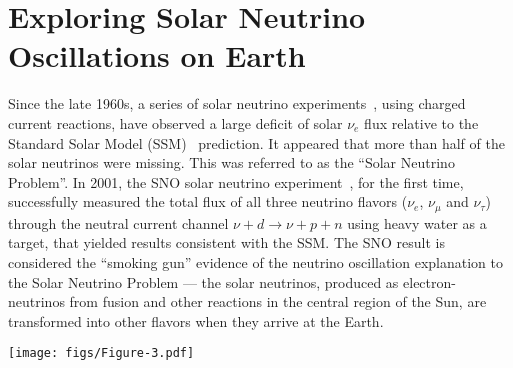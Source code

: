 \documentclass[aps,twocolumn,preprintnumbers,amsmath,superscriptaddress,amssymb,floats,nofootinbib]{revtex4-1}
\begin{document}
\newpage


\twocolumngrid


\section{Exploring Solar Neutrino Oscillations on Earth}
\label{sec:kamland}

Since the late 1960s, a series of solar neutrino experiments~\cite{Homestake,GALLEX,SAGE,Kamiokande,Super-Kamiokande}, using charged current reactions, have observed a large deficit of solar $\nu_e$ flux relative to the Standard Solar Model (SSM)~\cite{Bahcall} prediction.
It appeared that more than half of the solar neutrinos were missing.
This was referred to as the ``Solar Neutrino Problem''.
In 2001, the SNO solar neutrino experiment~\cite{SNO}, for the first time, successfully measured the total flux of all three neutrino flavors ($\nu_e$, $\nu_\mu$ and $\nu_\tau$) through the neutral current channel $\nu + d \to \nu + p + n$ using heavy water as a target, that yielded results consistent with the SSM.
The SNO result is considered the ``smoking gun'' evidence of the neutrino oscillation explanation to the Solar Neutrino Problem --- the solar neutrinos, produced as electron-neutrinos from fusion and other reactions in the central region of the Sun, are transformed into other flavors when they arrive at the Earth.

\begin{figure*}[htb]
  \centering
  \texttt{[image: figs/Figure-3.pdf]}
  \caption{ \label{fig:kamland}{\bf Results from KamLAND.} (a) The data points show the measured prompt energy spectrum of $\bar\nu_e$ candidate events. The shaded histograms show the expected backgrounds. The expected reactor spectra without oscillation and with best-fit oscillation are shown as the dashed histogram. All histograms incorporate the energy-dependent selection efficiency, which is shown on the top. Only $\sim$60\% of reactor $\bar\nu_e$'s are observed relative to the no-oscillation expectation.
  (b) The data points show the ratio of the background-subtracted
  $\bar\nu_e$ spectrum to the expectation for no-oscillation as a
  function of $L_{0}/E_{\nu}$. $L_{0}$ is the effective baseline taken as a
  flux-weighted average ($L_{0}$\,=\,180\,km).
  The spectrum indicates almost two cycles of periodic feature as expected from neutrino oscillations. The oscillation survival probability using the best estimates of $\theta_{12}$ and $|\Delta{m}^2_{21}|$ is given by the blue curve.
  The curve deviates from the perfect sinusoidal $L/E$ dependence since KamLAND has multiple baselines. Figures are reproduced, with permission, from Ref.~\cite{Kamland08}.
  }
\end{figure*}
\end{document}
